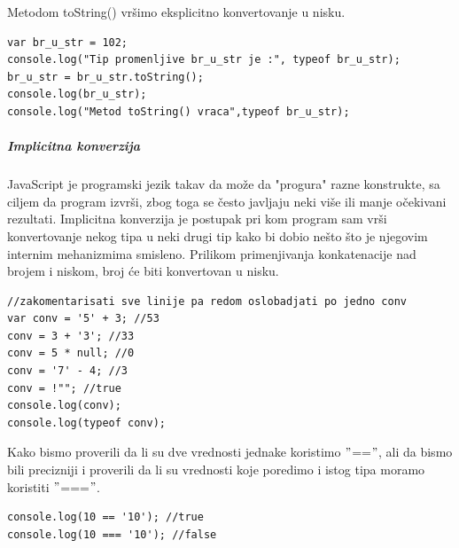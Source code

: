 \documentclass[a4paper]{article}
\begin{document}
Metodom toString() vršimo eksplicitno konvertovanje u nisku.
\begin{verbatim}
var br_u_str = 102;
console.log("Tip promenljive br_u_str je :", typeof br_u_str);
br_u_str = br_u_str.toString();
console.log(br_u_str);
console.log("Metod toString() vraca",typeof br_u_str);
\end{verbatim}

\subparagraph{Implicitna konverzija}
JavaScript je programski jezik takav da može da "progura" razne konstrukte, sa ciljem da program izvrši, zbog toga se često javljaju neki više ili manje očekivani rezultati. Implicitna konverzija je postupak pri kom program sam vrši konvertovanje nekog tipa u neki drugi tip kako bi dobio nešto što je njegovim internim mehanizmima smisleno. Prilikom primenjivanja konkatenacije nad brojem i niskom, broj će biti konvertovan u nisku.
\begin{verbatim}
//zakomentarisati sve linije pa redom oslobadjati po jedno conv
var conv = '5' + 3; //53
conv = 3 + '3'; //33
conv = 5 * null; //0
conv = '7' - 4; //3 
conv = !""; //true 
console.log(conv);
console.log(typeof conv);
\end{verbatim}
Kako bismo proverili da li su dve vrednosti jednake koristimo $"$==$"$, ali da bismo bili precizniji i proverili da li su vrednosti koje poredimo i istog tipa moramo koristiti $"$===$"$.
\begin{verbatim}
console.log(10 == '10'); //true
console.log(10 === '10'); //false
\end{verbatim}
\end{document}
